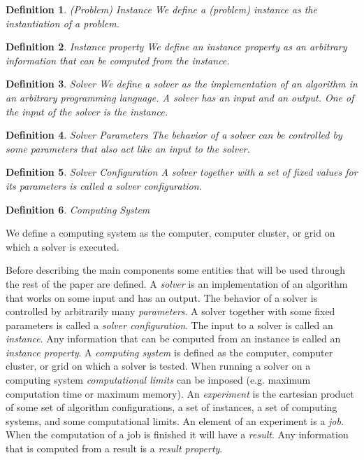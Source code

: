 \documentclass[twoside,a4paper]{refart}
\theoremstyle{dotless}
\newtheorem{definition}{Definition}[section]
\newcounter{ex}
\begin{document}
\begin{definition}{(Problem) Instance}
	We define a (problem) instance as the instantiation of a problem.  
\end{definition}

\begin{definition}{Instance property}
	We define an instance property as an arbitrary information that can be computed from the instance.  
\end{definition}

\begin{definition}{Solver}
	We define a solver as the implementation of an algorithm in an arbitrary programming language.  A solver has an input and an output. One of the input of the solver is the instance.
\end{definition}

\begin{definition}{Solver Parameters}
	The behavior of a solver can be controlled by some parameters that also act like an input to the solver. 
\end{definition}

\begin{definition}{Solver Configuration}
	A solver together with a set of fixed values for its parameters is called a solver configuration. 
\end{definition}

\begin{definition}{Computing System}
\end{definition} We define a computing system as the computer, computer cluster, or grid on which a solver is executed.  




Before describing the main components some entities that will be used through the rest of the paper are defined. A \textit{solver} is an implementation of an algorithm that works on some input and has an output. The behavior of a solver is controlled by arbitrarily many \textit{parameters}. A solver together with some fixed parameters is called a \textit{solver configuration}. The input to a solver is called an \textit{instance}. Any information that can be computed from an instance is called an \textit{instance property}. 
A \textit{computing system} is defined as the computer, computer cluster, or grid on which a solver is tested. When running a solver on a computing system \textit{computational limits} can be imposed (e.g. maximum computation time or maximum memory). An \textit{experiment} is the cartesian product of some set of algorithm configurations, a set of instances, a set of computing systems, and some computational limits. An element of an experiment is a \textit{job}. When the computation of a job is finished it will have a \textit{result}. Any information that is computed from a result is a \textit{result property}. 
\end{document}
